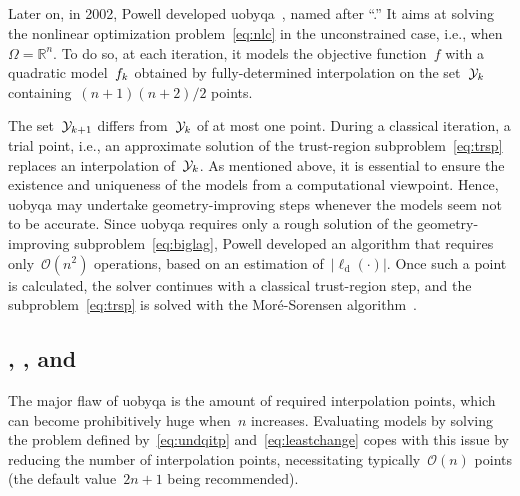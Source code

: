 \documentclass[
    smallextended,  %
    draft,          %
]{svjour3}
\newcommand{\R}{\mathbb{R}}
\newcommand{\abs}[2][]{#1\lvert#2#1\rvert}
\newcommand{\drop}{{\text{d}}}
\newcommand{\fset}{\Omega}
\newcommand{\objm}[1][k]{\obj\ifthenelse{\equal{#1}{}}{}{_{#1}}}
\newcommand{\obj}{f}
\newcommand{\xpt}[1][k]{\mathcal{Y}\ifthenelse{\equal{#1}{}}{}{_{#1}}}
\begin{document}
\subsection{}
\label{ssec:uobyqa}

Later on, in 2002, Powell developed \gls{uobyqa}~\cite{Powell_2002}, named after ``.''
It aims at solving the nonlinear optimization problem~\eqref{eq:nlc} in the unconstrained case, i.e., when~$\fset = \R^n$.
To do so, at each iteration, it models the objective function~$\obj$ with a quadratic model~$\objm$ obtained by fully-determined interpolation on the set~$\xpt$ containing~$(n + 1)(n + 2) / 2$ points.

The set~$\xpt[k + 1]$ differs from~$\xpt$ of at most one point.
During a classical iteration, a trial point, i.e., an approximate solution of the trust-region subproblem~\eqref{eq:trsp} replaces an interpolation of~$\xpt$.
As mentioned above, it is essential to ensure the existence and uniqueness of the models from a computational viewpoint.
Hence, \gls{uobyqa} may undertake geometry-improving steps whenever the models seem not to be accurate.
Since \gls{uobyqa} requires only a rough solution of the geometry-improving subproblem~\eqref{eq:biglag}, Powell developed an algorithm that requires only~$\mathcal{O}(n^2)$ operations, based on an estimation of~$\abs{\ell_{\drop}(\cdot)}$.
Once such a point is calculated, the solver continues with a classical trust-region step, and the subproblem~\eqref{eq:trsp} is solved with the Mor{\'{e}}-Sorensen algorithm~\cite{More_Sorensen_1983}.

\subsection{, , and }
\label{ssec:nbloa}

The major flaw of \gls{uobyqa} is the amount of required interpolation points, which can become prohibitively huge when~$n$ increases.
Evaluating models by solving the problem defined by~\eqref{eq:undqitp} and~\eqref{eq:leastchange} copes with this issue by reducing the number of interpolation points, necessitating typically~$\mathcal{O}(n)$ points (the default value~$2n + 1$ being recommended).
\end{document}

